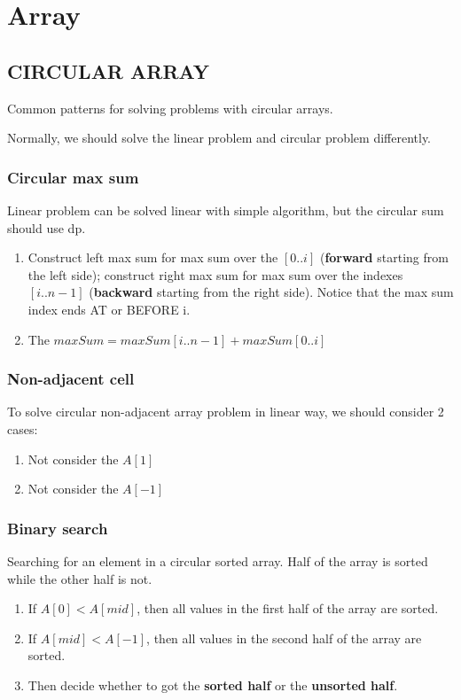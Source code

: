 \chapter{Array}
\section{CIRCULAR ARRAY}
Common patterns for solving problems with circular arrays.

Normally, we should solve the linear problem and circular problem differently.

\subsection{Circular max sum}
Linear problem can be solved linear with simple algorithm, but the circular sum should use dp. 
\begin{enumerate}
\item Construct left max sum for max sum over the $[0..i]$ (\textbf{forward} starting from the left side); construct right max sum for max sum over the indexes $[i..n-1]$ (\textbf{backward} starting from the right side). Notice that the max sum index ends AT or BEFORE i. 
\item The $maxSum = maxSum[i..n-1]+maxSum[0..i]$
\end{enumerate}

\subsection{Non-adjacent cell}
To solve circular non-adjacent array problem in linear way, we should consider 2 cases:
\begin{enumerate}
\item Not consider the $A[1]$
\item Not consider the $A[-1]$ 
\end{enumerate}

\subsection{Binary search}
Searching for an element in a circular sorted array. Half of the array is sorted while the other half is not.
\begin{enumerate}
\item If $A[0] < A[mid]$, then all values in the first half of the array are sorted.
\item If $A[mid] < A[-1]$, then all values in the second half of the array are sorted.
\item Then decide whether to got the \textbf{sorted half} or the \textbf{unsorted half}.
\end{enumerate}
